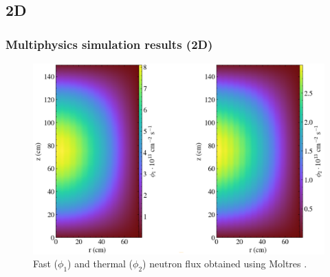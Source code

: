 \subsection{2D}
\begin{frame}
  \frametitle{Multiphysics simulation results (2D)}
  \begin{figure}
   \vspace{-0.1in}
   \includegraphics[height=0.85\textheight]{./images/moltres_flux.png}
   \vspace{-0.1in}
   \caption{Fast ($\phi_1$) and thermal ($\phi_2$) neutron flux obtained using Moltres 			\cite{lindsay_introduction_2018}.}
    \end{figure}
\end{frame}

